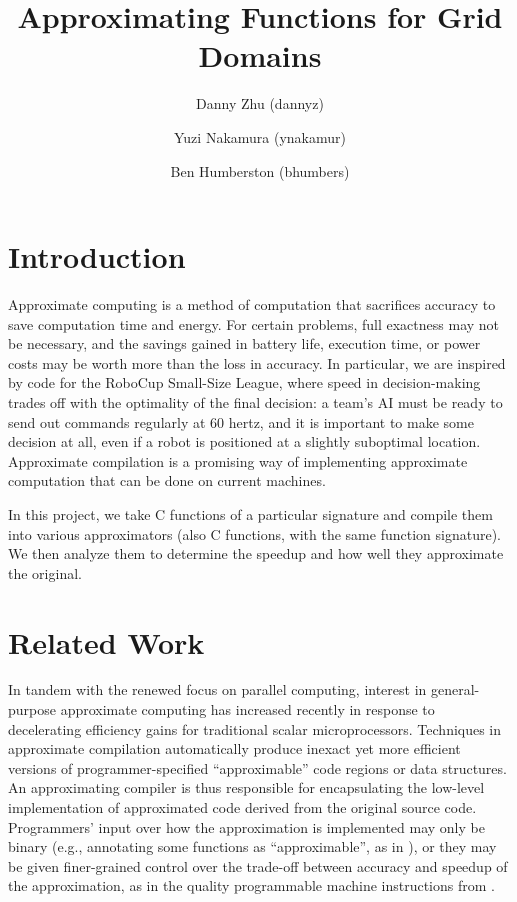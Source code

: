 \documentclass{article}
\begin{document}
\title{Approximating Functions for Grid Domains}
\author{Danny Zhu (dannyz) \and Yuzi Nakamura (ynakamur) \and Ben Humberston (bhumbers)}

\maketitle

\section{Introduction}

Approximate computing is a method of computation that sacrifices accuracy to save computation time and energy. For certain problems, full exactness may not be necessary, and the savings gained in battery life, execution time, or power costs may be worth more than the loss in accuracy. In particular, we are inspired by code for the RoboCup Small-Size League, where speed in decision-making trades off with the optimality of the final decision: a team's AI must be ready to send out commands regularly at 60 hertz, and it is important to make some decision at all, even if a robot is positioned at a slightly suboptimal location. Approximate compilation is a promising way of implementing approximate computation that can be done on current machines.

In this project, we take  C functions of a particular signature and compile them into various approximators (also C functions, with the same function signature). We then analyze them to determine the speedup and how well they approximate the original.

\section{Related Work}
In tandem with the renewed focus on parallel computing, interest in general-purpose approximate computing has increased recently in response to decelerating efficiency gains for traditional scalar microprocessors. Techniques in approximate compilation automatically produce inexact yet more efficient versions of programmer-specified ``approximable'' code regions or data structures. An approximating compiler is thus responsible for encapsulating the low-level implementation of approximated code derived from the original source code. Programmers' input over how the approximation is implemented may only be binary (e.g., annotating some functions as ``approximable'', as in \cite{Esmaeilzadeh12}), or they may be given finer-grained control over the trade-off between accuracy and speedup of the approximation, as in the quality programmable machine instructions from \cite{Venkataramani13}.
\end{document}
